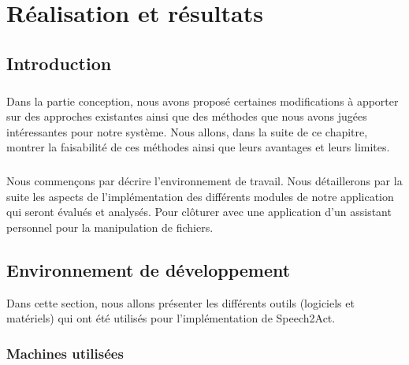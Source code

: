 \chapter{Réalisation et résultats}
\section{Introduction}
\paragraph{}Dans la partie conception, nous avons proposé certaines modifications à apporter sur des approches existantes ainsi que des méthodes que nous avons jugées intéressantes pour notre système. Nous allons, dans la suite de ce chapitre, montrer la faisabilité de ces méthodes ainsi que leurs avantages et leurs limites.
\paragraph{}Nous commençons par décrire l'environnement de travail. Nous détaillerons par la suite les aspects de l'implémentation des différents modules de notre application qui seront évalués et analysés. Pour clôturer avec une application d'un assistant personnel pour la manipulation de fichiers. 

\section{Environnement de développement}
Dans cette section, nous allons présenter les différents outils (logiciels et matériels) qui ont été utilisés pour l'implémentation de Speech2Act.
	\subsection{Machines utilisées}
